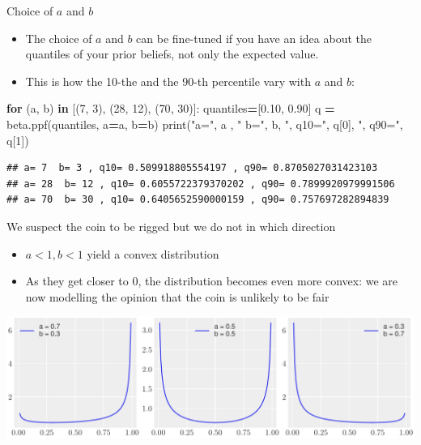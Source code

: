 \documentclass[
  13pt,
  ignorenonframetext,
]{beamer}
\newenvironment{Shaded}{\begin{snugshade}}{\end{snugshade}}
\newcommand{\BuiltInTok}[1]{#1}
\newcommand{\ControlFlowTok}[1]{\textcolor[rgb]{0.13,0.29,0.53}{\textbf{#1}}}
\newcommand{\DecValTok}[1]{\textcolor[rgb]{0.00,0.00,0.81}{#1}}
\newcommand{\FloatTok}[1]{\textcolor[rgb]{0.00,0.00,0.81}{#1}}
\newcommand{\KeywordTok}[1]{\textcolor[rgb]{0.13,0.29,0.53}{\textbf{#1}}}
\newcommand{\NormalTok}[1]{#1}
\newcommand{\OperatorTok}[1]{\textcolor[rgb]{0.81,0.36,0.00}{\textbf{#1}}}
\newcommand{\StringTok}[1]{\textcolor[rgb]{0.31,0.60,0.02}{#1}}
\providecommand{\tightlist}{%
  \setlength{\itemsep}{0pt}\setlength{\parskip}{0pt}}
\begin{document}
\begin{frame}[fragile]{Choice of \(a\) and \(b\)}
\protect\hypertarget{choice-of-a-and-b}{}
\begin{itemize}
\tightlist
\item
  The choice of \(a\) and \(b\) can be fine-tuned if you have an idea
  about the quantiles of your prior beliefs, not only the expected
  value.
\item
  This is how the 10-the and the 90-th percentile vary with \(a\) and
  \(b\):
\end{itemize}

\begin{Shaded}
\begin{Highlighting}[]
\ControlFlowTok{for}\NormalTok{ (a, b) }\KeywordTok{in}\NormalTok{  [(}\DecValTok{7}\NormalTok{, }\DecValTok{3}\NormalTok{), (}\DecValTok{28}\NormalTok{, }\DecValTok{12}\NormalTok{), (}\DecValTok{70}\NormalTok{, }\DecValTok{30}\NormalTok{)]:}
\NormalTok{    quantiles}\OperatorTok{=}\NormalTok{[}\FloatTok{0.10}\NormalTok{, }\FloatTok{0.90}\NormalTok{]}
\NormalTok{    q }\OperatorTok{=}\NormalTok{ beta.ppf(quantiles, a}\OperatorTok{=}\NormalTok{a, b}\OperatorTok{=}\NormalTok{b)}
    \BuiltInTok{print}\NormalTok{(}\StringTok{"a="}\NormalTok{, a , }\StringTok{" b="}\NormalTok{, b, }\StringTok{", q10="}\NormalTok{, q[}\DecValTok{0}\NormalTok{], }\StringTok{", q90="}\NormalTok{, q[}\DecValTok{1}\NormalTok{])}
\end{Highlighting}
\end{Shaded}

\begin{verbatim}
## a= 7  b= 3 , q10= 0.509918805554197 , q90= 0.8705027031423103
## a= 28  b= 12 , q10= 0.6055722379370202 , q90= 0.7899920979991506
## a= 70  b= 30 , q10= 0.6405652590000159 , q90= 0.757697282894839
\end{verbatim}
\end{frame}

\begin{frame}{We suspect the coin to be rigged but we do not in which
direction}
\protect\hypertarget{we-suspect-the-coin-to-be-rigged-but-we-do-not-in-which-direction}{}
\begin{itemize}
\tightlist
\item
  \(a<1, b<1\) yield a convex distribution
\item
  As they get closer to 0, the distribution becomes even more convex: we
  are now modelling the opinion that the coin is unlikely to be fair
\end{itemize}

\begin{center}\includegraphics{3-coinTossing_files/figure-beamer/unnamed-chunk-6-7} \end{center}
\end{frame}
\end{document}
